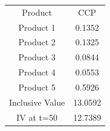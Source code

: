 \begin{tabular}{cc}
Product & CCP \\
Product 1 & 0.1352 \\
Product 2 & 0.1325 \\
Product 3 & 0.0844 \\
Product 4 & 0.0553 \\
Product 5 & 0.5926 \\
Inclusive Value & 13.0592 \\
IV at t=50 & 12.7389 \\
\end{tabular}